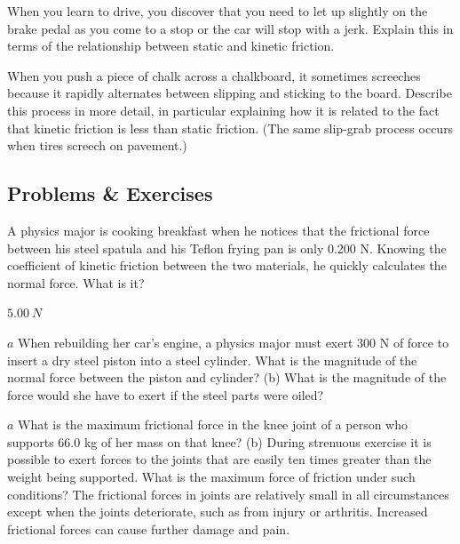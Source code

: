 \documentclass[
]{book}
\begin{document}
\hypertarget{fs-id1425681}{}
\leavevmode{}%
When you learn to drive, you discover that you need to let up slightly
on the brake pedal as you come to a stop or the car will stop with a
jerk. Explain this in terms of the relationship between static and
kinetic friction.

\hypertarget{fs-id1272970}{}
\leavevmode{}%
When you push a piece of chalk across a chalkboard, it sometimes
screeches because it rapidly alternates between slipping and sticking to
the board. Describe this process in more detail, in particular
explaining how it is related to the fact that kinetic friction is less
than static friction. (The same slip-grab process occurs when tires
screech on pavement.)

\hypertarget{fs-id1288634}{}
\hypertarget{problems-exercises-10}{%
\subsection{Problems \& Exercises}\label{problems-exercises-10}}

\hypertarget{fs-id1462497}{}
\leavevmode{}%
A physics major is cooking breakfast when he notices that the frictional
force between his steel spatula and his Teflon frying pan is only 0.200
N. Knowing the coefficient of kinetic friction between the two
materials, he quickly calculates the normal force. What is it?

\leavevmode{}%
\(5.00\ N{}\)

\hypertarget{fs-id1534547}{}
\leavevmode{}%
\(a\) When rebuilding her car's engine, a physics major must exert 300
N of force to insert a dry steel piston into a steel cylinder. What is
the magnitude of the normal force between the piston and cylinder? (b)
What is the magnitude of the force would she have to exert if the steel
parts were oiled?

\hypertarget{fs-id1250006}{}
\leavevmode{}%
\(a\) What is the maximum frictional force in the knee joint of a person
who supports 66.0 kg of her mass on that knee? (b) During strenuous
exercise it is possible to exert forces to the joints that are easily
ten times greater than the weight being supported. What is the maximum
force of friction under such conditions? The frictional forces in joints
are relatively small in all circumstances except when the joints
deteriorate, such as from injury or arthritis. Increased frictional
forces can cause further damage and pain.
\end{document}
